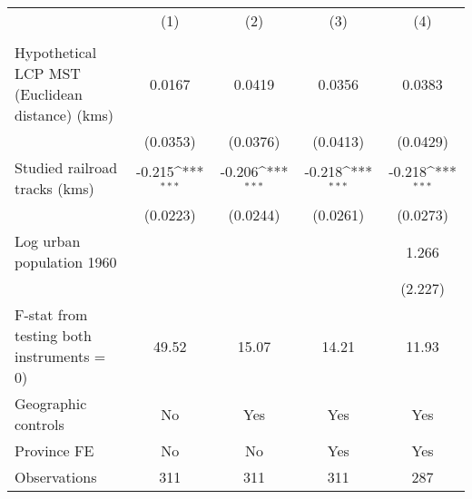{
\def\sym#1{\ifmmode^{#1}\else\(^{#1}\)\fi}
\begin{tabular}{l*{4}{c}}
\hline\hline
                &\multicolumn{1}{c}{(1)}&\multicolumn{1}{c}{(2)}&\multicolumn{1}{c}{(3)}&\multicolumn{1}{c}{(4)}\\
                &\multicolumn{1}{c}{}&\multicolumn{1}{c}{}&\multicolumn{1}{c}{}&\multicolumn{1}{c}{}\\
\hline
Hypothetical LCP MST (Euclidean distance) (kms)&   0.0167         &   0.0419         &   0.0356         &   0.0383         \\
                & (0.0353)         & (0.0376)         & (0.0413)         & (0.0429)         \\
[1em]
Studied railroad tracks (kms)&   -0.215\sym{***}&   -0.206\sym{***}&   -0.218\sym{***}&   -0.218\sym{***}\\
                & (0.0223)         & (0.0244)         & (0.0261)         & (0.0273)         \\
[1em]
Log urban population 1960&                  &                  &                  &    1.266         \\
                &                  &                  &                  &  (2.227)         \\
\hline
F-stat from testing both instruments = 0)&    49.52         &    15.07         &    14.21         &    11.93         \\
Geographic controls&       No         &      Yes         &      Yes         &      Yes         \\
Province FE     &       No         &       No         &      Yes         &      Yes         \\
Observations    &      311         &      311         &      311         &      287         \\
\hline\hline
\end{tabular}
}
